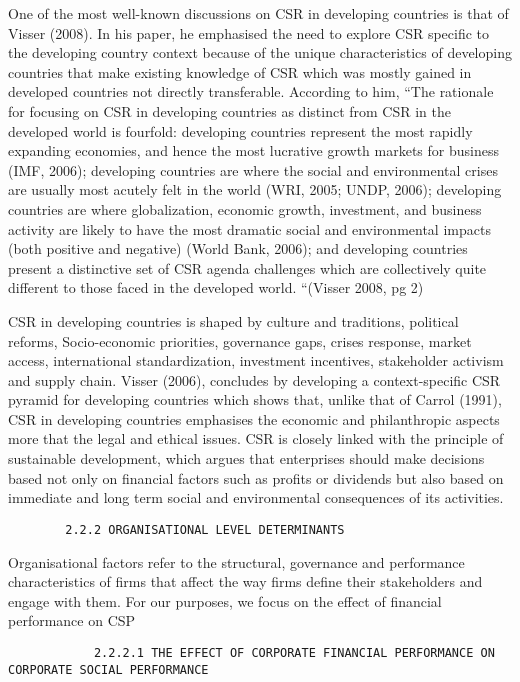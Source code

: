 \documentclass[
]{mitthesis}
\begin{document}
One of the most well-known discussions on CSR in developing countries is that of Visser (2008). In his paper, he emphasised the need to explore CSR specific to the developing country context because of the unique characteristics of developing countries that make existing knowledge of CSR which was mostly gained in developed countries not directly transferable. According to him,
``The rationale for focusing on CSR in developing countries as distinct from CSR in the developed world is fourfold:
developing countries represent the most rapidly expanding economies, and hence the most lucrative growth markets for business (IMF, 2006);
developing countries are where the social and environmental crises are usually most acutely felt in the world (WRI, 2005; UNDP, 2006);
developing countries are where globalization, economic growth, investment, and business activity are likely to have the most dramatic social and environmental impacts (both positive and negative) (World Bank, 2006); and
developing countries present a distinctive set of CSR agenda challenges which are collectively quite different to those faced in the developed world. ``(Visser 2008, pg 2)

CSR in developing countries is shaped by culture and traditions, political reforms, Socio-economic priorities, governance gaps, crises response, market access, international standardization, investment incentives, stakeholder activism and supply chain. Visser (2006), concludes by developing a context-specific CSR pyramid for developing countries which shows that, unlike that of Carrol (1991), CSR in developing countries emphasises the economic and philanthropic aspects more that the legal and ethical issues. CSR is closely linked with the principle of sustainable development, which argues that enterprises should make decisions based not only on financial factors such as profits or dividends but also based on immediate and long term social and environmental consequences of its activities.

\begin{verbatim}
        2.2.2 ORGANISATIONAL LEVEL DETERMINANTS
\end{verbatim}

Organisational factors refer to the structural, governance and performance characteristics of firms that affect the way firms define their stakeholders and engage with them. For our purposes, we focus on the effect of financial performance on CSP

\begin{verbatim}
            2.2.2.1 THE EFFECT OF CORPORATE FINANCIAL PERFORMANCE ON CORPORATE SOCIAL PERFORMANCE
\end{verbatim}
\end{document}
